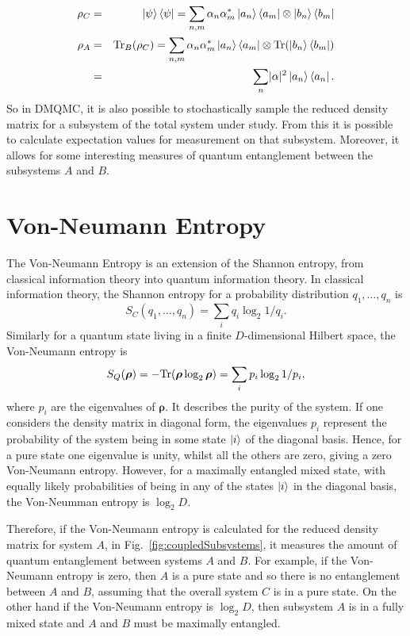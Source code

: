 \begin{eqnarray}
\rho_C &=& \ket{\psi}\bra{\psi} = \sum_{n,m}\alpha_n\alpha_m^*\ket{a_n}\bra{a_m}\otimes\ket{b_n}\bra{b_m}\\
\rho_A &=& \textnormal{Tr}_B(\rho_C) = \sum_{n,m}\alpha_n\alpha_m^*\ket{a_n}\bra{a_m}\otimes\textnormal{Tr}(\ket{b_n}\bra{b_m})\\
&=&\sum_n \lvert \alpha\rvert^2 \ket{a_n} \bra{a_n}.
\label{eq:traceOut}
\end{eqnarray}
So in DMQMC, it is also possible to stochastically sample the reduced density matrix for a subsystem of the total system under study. From this it is possible to calculate expectation values for measurement on that subsystem. Moreover, it allows for some interesting measures of quantum entanglement between the subsystems $A$ and $B$.

\section{Von-Neumann Entropy}

The Von-Neumann Entropy is an extension of the Shannon entropy, from classical information theory into quantum information theory. In classical information theory, the Shannon entropy for a probability distribution $q_1,\dots, q_n$ is 
\begin{equation}
S_C(q_1,\dots,q_n)=\sum_i q_i \log_2 1/q_i.
\end{equation}
Similarly for a quantum state living in a finite $D$-dimensional Hilbert space, the Von-Neumann entropy is
\begin{equation}
\label{eq:VonNeumannEntropy}
S_Q(\bm{\rho}) = -\textnormal{Tr}(\bm{\rho}\log_2\bm{\rho}) = \sum_i p_i \log_2 1/p_i,
\end{equation}
where $p_i$ are the eigenvalues of $\bm{\rho}$. It describes the purity of the system. If one considers the density matrix in diagonal form, the eigenvalues $p_i$ represent the probability of the system being in some state $\ket{i}$ of the diagonal basis. Hence, for a pure state one eigenvalue is unity, whilst all the others are zero, giving a zero Von-Neumann entropy. However, for a maximally entangled mixed state, with equally likely probabilities of being in any of the states $\ket{i}$ in the diagonal basis, the Von-Neumman entropy is $\log_2{D}$. 

Therefore, if the Von-Neumann entropy is calculated for the reduced density matrix for system $A$, in Fig.~\ref{fig:coupledSubsystems}, it measures the amount of quantum entanglement between systems $A$ and $B$. For example, if the Von-Neumann entropy is zero, then $A$ is a pure state and so there is no entanglement between $A$ and $B$, assuming that the overall system $C$ is in a pure state. On the other hand if the Von-Neumann entropy is $\log_2{D}$, then subsystem $A$ is in a fully mixed state and $A$ and $B$ must be maximally entangled.

